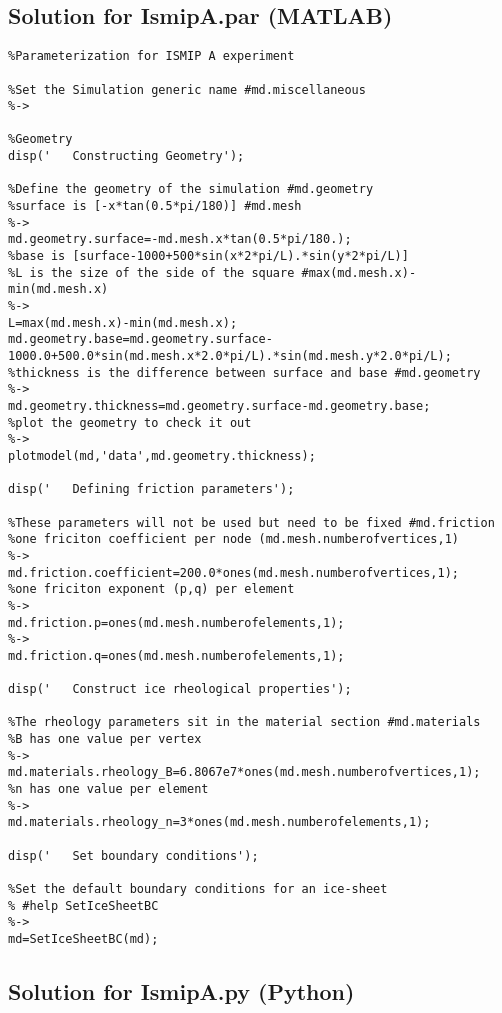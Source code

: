 \subsection{Solution for IsmipA.par (MATLAB)}%
\begin{verbatim}%Parameterization for ISMIP A experiment

%Set the Simulation generic name #md.miscellaneous
%->

%Geometry
disp('   Constructing Geometry');

%Define the geometry of the simulation #md.geometry
%surface is [-x*tan(0.5*pi/180)] #md.mesh
%->
md.geometry.surface=-md.mesh.x*tan(0.5*pi/180.);
%base is [surface-1000+500*sin(x*2*pi/L).*sin(y*2*pi/L)]
%L is the size of the side of the square #max(md.mesh.x)-min(md.mesh.x)
%->
L=max(md.mesh.x)-min(md.mesh.x);
md.geometry.base=md.geometry.surface-1000.0+500.0*sin(md.mesh.x*2.0*pi/L).*sin(md.mesh.y*2.0*pi/L);
%thickness is the difference between surface and base #md.geometry
%->
md.geometry.thickness=md.geometry.surface-md.geometry.base;
%plot the geometry to check it out
%->
plotmodel(md,'data',md.geometry.thickness);

disp('   Defining friction parameters');

%These parameters will not be used but need to be fixed #md.friction
%one friciton coefficient per node (md.mesh.numberofvertices,1)
%->
md.friction.coefficient=200.0*ones(md.mesh.numberofvertices,1);
%one friciton exponent (p,q) per element
%->
md.friction.p=ones(md.mesh.numberofelements,1);
%->
md.friction.q=ones(md.mesh.numberofelements,1);

disp('   Construct ice rheological properties');

%The rheology parameters sit in the material section #md.materials
%B has one value per vertex
%->
md.materials.rheology_B=6.8067e7*ones(md.mesh.numberofvertices,1);
%n has one value per element
%->
md.materials.rheology_n=3*ones(md.mesh.numberofelements,1);

disp('   Set boundary conditions');

%Set the default boundary conditions for an ice-sheet
% #help SetIceSheetBC
%->
md=SetIceSheetBC(md);\end{verbatim}
\subsection{Solution for IsmipA.py (Python)}%
\begin{verbatim}
\end{verbatim}
